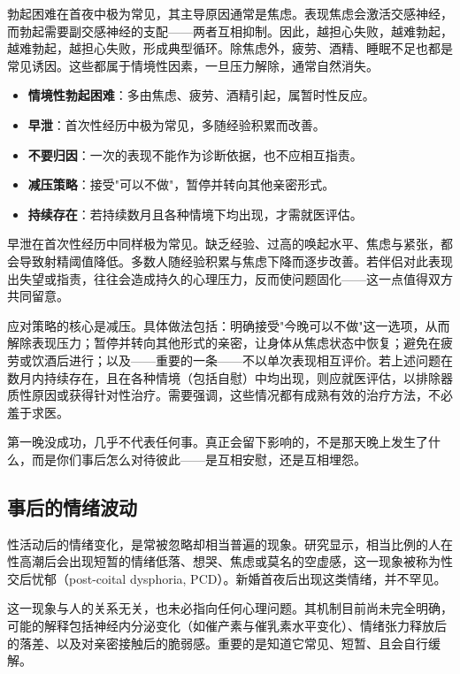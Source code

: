 \documentclass[12pt,UTF8]{ctexbook}
\newcommand{\keyword}[1]{\textbf{#1}}
\begin{document}
勃起困难在首夜中极为常见，其主导原因通常是焦虑。表现焦虑会激活交感神经，而勃起需要副交感神经的支配——两者互相抑制。因此，越担心失败，越难勃起，越难勃起，越担心失败，形成典型循环。除焦虑外，疲劳、酒精、睡眠不足也都是常见诱因。这些都属于情境性因素，一旦压力解除，通常自然消失。

\begin{itemize}
	\item \keyword{情境性勃起困难}：多由焦虑、疲劳、酒精引起，属暂时性反应。
	\item \keyword{早泄}：首次性经历中极为常见，多随经验积累而改善。
	\item \keyword{不要归因}：一次的表现不能作为诊断依据，也不应相互指责。
	\item \keyword{减压策略}：接受"可以不做"，暂停并转向其他亲密形式。
	\item \keyword{持续存在}：若持续数月且各种情境下均出现，才需就医评估。
\end{itemize}

早泄在首次性经历中同样极为常见。缺乏经验、过高的唤起水平、焦虑与紧张，都会导致射精阈值降低。多数人随经验积累与焦虑下降而逐步改善。若伴侣对此表现出失望或指责，往往会造成持久的心理压力，反而使问题固化——这一点值得双方共同留意。

应对策略的核心是减压。具体做法包括：明确接受"今晚可以不做"这一选项，从而解除表现压力；暂停并转向其他形式的亲密，让身体从焦虑状态中恢复；避免在疲劳或饮酒后进行；以及——重要的一条——不以单次表现相互评价。若上述问题在数月内持续存在，且在各种情境（包括自慰）中均出现，则应就医评估，以排除器质性原因或获得针对性治疗。需要强调，这些情况都有成熟有效的治疗方法，不必羞于求医。

\begin{tcolorbox}[colback=pink!5!white,colframe=red!50!black,title=贴心小叮咛]
	第一晚没成功，几乎不代表任何事。真正会留下影响的，不是那天晚上发生了什么，而是你们事后怎么对待彼此——是互相安慰，还是互相埋怨。
\end{tcolorbox}
\subsection{事后的情绪波动}

性活动后的情绪变化，是常被忽略却相当普遍的现象。研究显示，相当比例的人在性高潮后会出现短暂的情绪低落、想哭、焦虑或莫名的空虚感，这一现象被称为性交后忧郁（post-coital dysphoria, PCD）。新婚首夜后出现这类情绪，并不罕见。

这一现象与人的关系无关，也未必指向任何心理问题。其机制目前尚未完全明确，可能的解释包括神经内分泌变化（如催产素与催乳素水平变化）、情绪张力释放后的落差、以及对亲密接触后的脆弱感。重要的是知道它常见、短暂、且会自行缓解。
\end{document}
